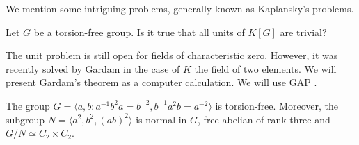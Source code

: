 
We mention some intriguing problems, generally known as Kaplansky's problems. 

\begin{problem}[Units]
	\label{prob:units}
	Let $G$ be a torsion-free group. Is it true that all units of $K[G]$ are
	trivial?
\end{problem}

The unit problem is still open for fields of characteristic zero. 
However, it was recently solved by Gardam \cite{MR4334981} 
in the case of 
$K$ the field of two elements. We will present Gardam's theorem 
as a computer calculation. We will use \textsf{GAP} \cite{GAP4}.  

\begin{lemma}
    The group $G=\langle a,b:a^{-1}b^2a=b^{-2},b^{-1}a^2b=a^{-2}\rangle$
    is torsion-free. Moreover, the subgroup $N=\langle a^2,b^2,(ab)^2\rangle$ is normal in $G$, 
    free-abelian of rank three and $G/N\simeq C_2\times C_2$.
\end{lemma}

